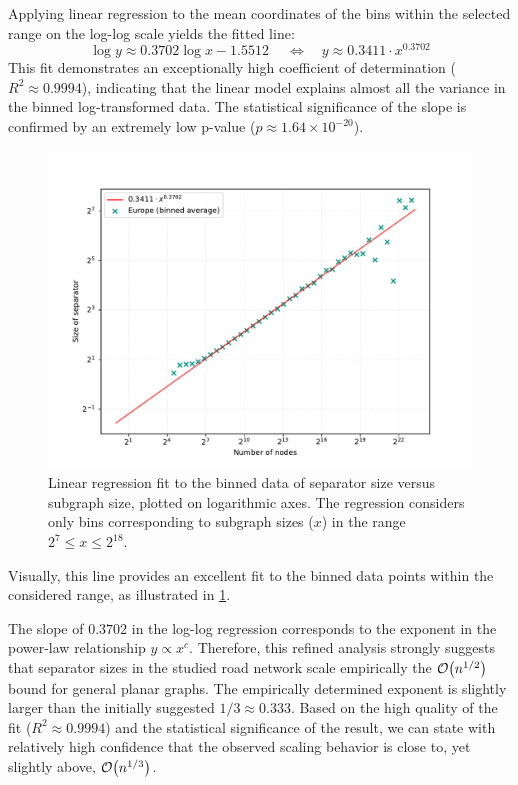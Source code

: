 Applying linear regression to the mean coordinates of the bins within the selected range on the log-log scale yields the fitted line:
\[ \log y \approx 0.3702 \log x - 1.5512\ \quad\iff\quad y \approx 0.3411 \cdot x^{0.3702}\]
This fit demonstrates an exceptionally high coefficient of determination (\( R^2 \approx 0.9994 \)), indicating that the linear model explains almost all the variance in the binned log-transformed data.
The statistical significance of the slope is confirmed by an extremely low p-value (\( p \approx 1.64 \times 10^{-20} \)).

\begin{figure}[tbhp]
    \centering
    \includegraphics[width=0.7\linewidth]{graphics/EuropeShowFit.pdf}
    \caption{Linear regression fit to the binned data of separator size versus subgraph size, plotted on logarithmic axes. The regression considers only bins corresponding to subgraph sizes (\(x\)) in the range \( 2^7 \le x \le 2^{18} \).}
    \label{fig:separator_size_loglog_fit}
\end{figure}

Visually, this line provides an excellent fit to the binned data points within the considered range, as illustrated in \cref{fig:separator_size_loglog_fit}.

The slope of \( 0.3702 \) in the log-log regression corresponds to the exponent in the power-law relationship \( y \propto x^c \).
Therefore, this refined analysis strongly suggests that separator sizes in the studied road network scale empirically the \( \mathcal{O}\!\left(n^{1/2}\right) \) bound for general planar graphs.
The empirically determined exponent is slightly larger than the initially suggested \( 1/3 \approx 0.333 \).
Based on the high quality of the fit (\( R^2 \approx 0.9994 \)) and the statistical significance of the result, we can state with relatively high confidence that the observed scaling behavior is close to, yet slightly above, \( \mathcal{O}\!\left(n^{1/3}\right) \).

